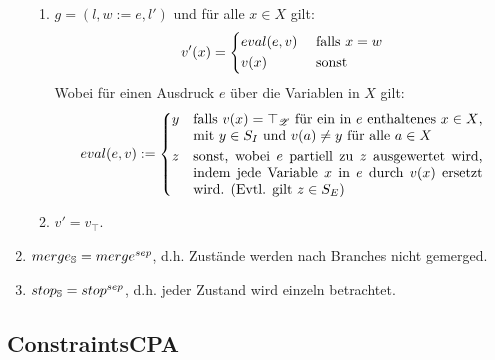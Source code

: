 \begin{enumerate}
\begin{enumerate}[1.]
      \item $g = (l, w := e, l')$ und f\"ur alle $x \in X$ gilt:
        \[
          v'(x) = \begin{dcases}
            eval(e, v) & \text{ falls $x = w$} \\
            v(x)       & \text{ sonst}
          \end{dcases}
        \]
        Wobei f\"ur einen Ausdruck $e$ \"uber die Variablen in $X$ gilt:
        \[
          eval(e, v) := \begin{dcases}
            y & \parbox[t]{.6\textwidth}{ falls $v(x) = \top_\valueset$ f\"ur ein in $e$ enthaltenes $x \in X$,
                       mit $y \in S_I$ und $v(a) \neq y$ f\"ur alle $a \in X$ } \\
            z & \parbox[t]{.6\textwidth}{ sonst, wobei $e$ partiell zu $z$ ausgewertet wird, indem jede Variable $x$ in $e$ durch $v(x)$ ersetzt wird. (Evtl. gilt $z \in S_E$) }
          \end{dcases}
        \]

      \item $v' = v_\top$.
    \end{enumerate}

  \item $merge_{\mathbb{S}} = merge^{sep}$, d.h. Zust\"ande werden nach Branches nicht gemerged.
  \item $stop_{\mathbb{S}} = stop^{sep}$, d.h. jeder Zustand wird einzeln betrachtet.
\end{enumerate}

\subsection{ConstraintsCPA}

